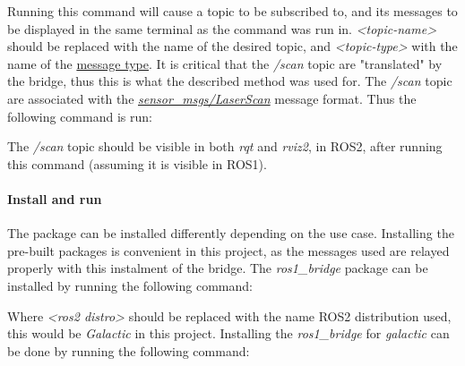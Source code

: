 Running this command will cause a topic to be subscribed to, and its messages to be displayed in the same terminal as the command was run in. \textit{<topic-name>} should be replaced with the name of the desired topic, and \textit{<topic-type>} with the name of the \href{https://docs.ros.org/en/noetic/api/sensor_msgs/html/msg/}{message type}. It is critical that the \textit{/scan} topic are "translated" by the bridge, thus this is what the described method was used for. The \textit{/scan} topic are associated with the \href{https://docs.ros.org/en/noetic/api/sensor_msgs/html/msg/LaserScan.html}{\textit{sensor\_msgs/LaserScan}} message format. Thus the following command is run:

\begin{tcolorbox}[width=\textwidth,colback={black},colupper=white, title={ubuntu terminal},colbacktitle=gray!125,coltitle=gray!50]\label{shell:echo1}    
\end{tcolorbox} 

The \textit{/scan} topic should be visible in both \textit{rqt} and \textit{rviz2}, in ROS2, after running this command (assuming it is visible in ROS1). 

\paragraph{Install and run}
The package can be installed differently depending on the use case. Installing the pre-built packages is convenient in this project, as the messages used are relayed properly with this instalment of the bridge. The \textit{ros1\_bridge} package can be installed by running the following command: 

\begin{tcolorbox}[width=\textwidth,colback={black},colupper=white, title={ubuntu terminal},colbacktitle=gray!125,coltitle=gray!50]\label{shell:echo1}    
\end{tcolorbox} 

Where \textit{<ros2 distro>} should be replaced with the name ROS2 distribution used, this would be \textit{Galactic} in this project. Installing the \textit{ros1\_bridge} for \textit{galactic} can be done by running the following command:

\begin{tcolorbox}[width=\textwidth,colback={black},colupper=white, title={ubuntu terminal},colbacktitle=gray!125,coltitle=gray!50]\label{shell:echo1}    
\end{tcolorbox} 

